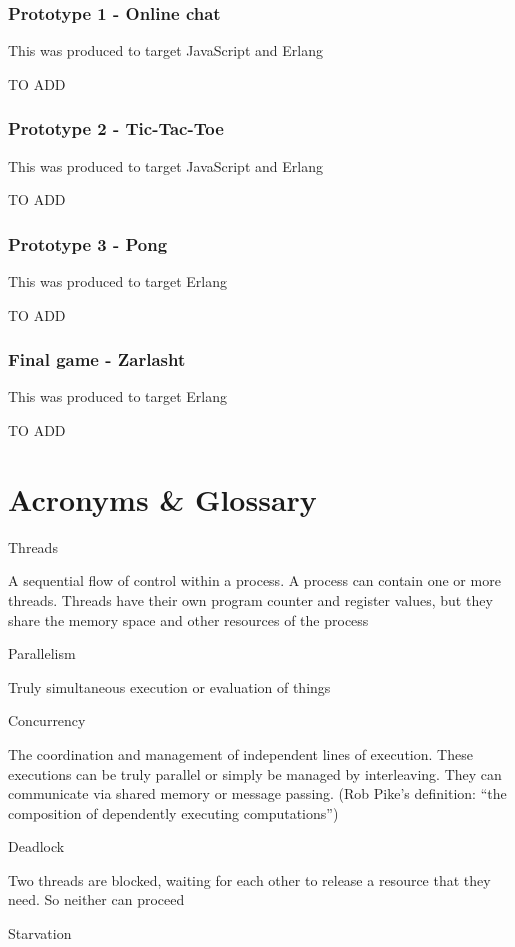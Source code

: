 \documentclass[]{final}
\begin{document}
\subsection{Prototype 1 - Online chat}
This was produced to target JavaScript and Erlang%

TO ADD
\subsection{Prototype 2 - Tic-Tac-Toe}
This was produced to target JavaScript and Erlang%

TO ADD
\subsection{Prototype 3 - Pong}
This was produced to target Erlang%

TO ADD
\subsection{Final game - Zarlasht}
This was produced to target Erlang%

TO ADD
\chapter{Acronyms \& Glossary}
Threads

A sequential flow of control within a process. A process can contain one or more threads.
Threads have their own program counter and register values, but they share the memory space
and other resources of the process

Parallelism

Truly simultaneous execution or evaluation of things

Concurrency

The coordination and management of independent lines of execution. These executions
can be truly parallel or simply be managed by interleaving. They can communicate
via shared memory or message passing. (Rob Pike's definition: “the composition of
dependently executing computations”)

Deadlock

Two threads are blocked, waiting for each other to release a resource that they need. So neither can proceed

Starvation
\end{document}
